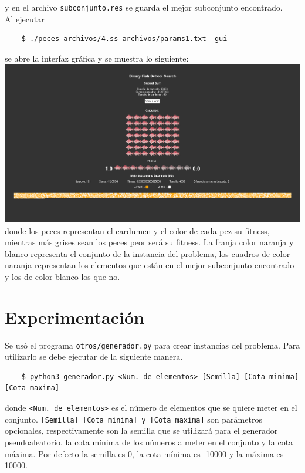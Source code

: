 \documentclass[12pt]{article}
\begin{document}
y en el archivo \texttt{subconjunto.res} se guarda el mejor subconjunto encontrado. \\

Al ejecutar

\begin{verbatim}
    $ ./peces archivos/4.ss archivos/params1.txt -gui
\end{verbatim}

se abre la interfaz gráfica y se muestra lo siguiente: \\
\includegraphics[scale=0.262]{media/gui} \\

donde los peces representan el cardumen y el color de cada pez su fitness, mientras más grises sean los peces peor será su fitness. La franja color naranja y blanco representa el conjunto de la instancia del problema, los cuadros de color naranja representan los elementos que están en el mejor subconjunto encontrado y los de color blanco los que no. 

\section{Experimentación}

Se usó el programa \texttt{otros/generador.py} para crear instancias del problema. Para utilizarlo se debe ejecutar de la siguiente manera.
\begin{verbatim}
    $ python3 generador.py <Num. de elementos> [Semilla] [Cota minima] [Cota maxima]
\end{verbatim}

donde \texttt{<Num. de elementos>} es el número de elementos que se quiere meter en el conjunto. \texttt{[Semilla] [Cota minima] y [Cota maxima]} son parámetros opcionales, respectivamente son la semilla que se utilizará para el generador pseudoaleatorio, la cota mínima de los números a meter en el conjunto y la cota máxima. Por defecto la semilla es 0, la cota mínima es -10000 y la máxima es 10000. \\
\end{document}
